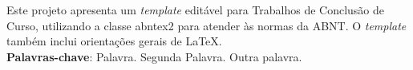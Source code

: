 
\begin{resumo}[RESUMO]
\begin{SingleSpacing}

Este projeto apresenta um \emph{template} editável para Trabalhos de Conclusão de Curso, utilizando a classe {\ttfamily abntex2} para atender às normas da ABNT. O \emph{template} também inclui orientações gerais de \LaTeX{}. \\

\textbf{Palavras-chave}: Palavra. Segunda Palavra. Outra palavra.

\end{SingleSpacing}
\end{resumo}
